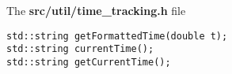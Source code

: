 
The \textbf{src/util/time\_tracking.h} file

\begin{lstlisting}[style=CStyle]
std::string getFormattedTime(double t);
std::string currentTime();
std::string getCurrentTime();
\end{lstlisting}
